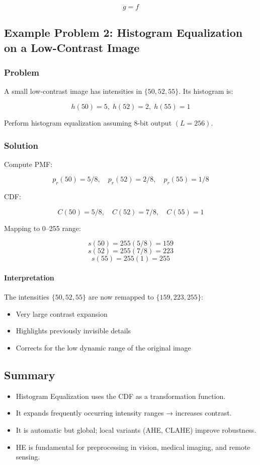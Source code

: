 \documentclass{AnantDocumentation}
\begin{document}
\[
g = f
\]

\subsection{Example Problem 2: Histogram Equalization on a Low-Contrast Image}

\subsubsection*{Problem}

A small low-contrast image has intensities in \(\{50, 52, 55\}\).  
Its histogram is:

\[
h(50)=5,\; h(52)=2,\; h(55)=1
\]

Perform histogram equalization assuming 8-bit output \((L = 256)\).

\subsubsection*{Solution}

Compute PMF:

\[
p_r(50)=5/8, \quad p_r(52)=2/8, \quad p_r(55)=1/8
\]

CDF:

\[
C(50)=5/8,\quad C(52)=7/8,\quad C(55)=1
\]

Mapping to 0–255 range:

\[
s(50) = 255(5/8) = 159
\]
\[
s(52) = 255(7/8) = 223
\]
\[
s(55) = 255(1) = 255
\]

\paragraph{Interpretation}

The intensities \(\{50,52,55\}\) are now remapped to \(\{159,223,255\}\):

\begin{itemize}
\item Very large contrast expansion  
\item Highlights previously invisible details  
\item Corrects for the low dynamic range of the original image
\end{itemize}

\subsection{Summary}

\begin{itemize}
\item Histogram Equalization uses the CDF as a transformation function.
\item It expands frequently occurring intensity ranges → increases contrast.
\item It is automatic but global; local variants (AHE, CLAHE) improve robustness.
\item HE is fundamental for preprocessing in vision, medical imaging, and remote sensing.
\end{itemize}
\end{document}

